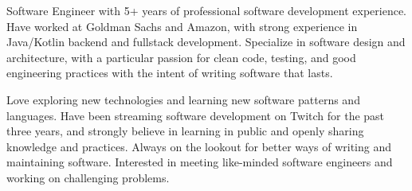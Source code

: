 

\begin{cvparagraph}

Software Engineer with 5+ years of professional software development experience. Have worked at Goldman Sachs and Amazon, with strong experience in Java/Kotlin backend and fullstack development. Specialize in software design and architecture, with a particular passion for clean code, testing, and good engineering practices with the intent of writing software that lasts.

Love exploring new technologies and learning new software patterns and languages. Have been streaming software development on Twitch for the past three years, and strongly believe in learning in public and openly sharing knowledge and practices. Always on the lookout for better ways of writing and maintaining software. Interested in meeting like-minded software engineers and working on challenging problems.
\end{cvparagraph}
